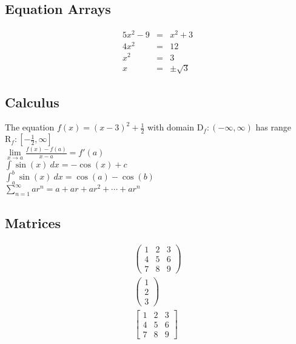 \documentclass[11pt]{article}
\begin{document}
\subsection{Equation Arrays}
\begin{eqnarray*}
5x^2-9&=&x^2+3\\
4x^2&=&12\\
x^2&=&3\\
x&=&\pm\sqrt{3}
\end{eqnarray*}

\subsection{Calculus}
The equation $f(x)=(x-3)^2+\frac{1}{2}$ with domain $\mathrm{D}_f:(-\infty,\infty)$ has range $\mathrm{R}_f:\left[-\frac{1}{2}, \infty\right]$\\

$\displaystyle{\lim \limits_{x \to a} \frac{f(x)-f(a)}{x-a} =f'(a)}$\\

$\displaystyle{\int \sin (x)\ dx = -\cos (x)+c}$\\

$\displaystyle{\int_a^b \sin (x)\ dx = \cos (a) - \cos (b)}$\\

$\displaystyle{\sum \limits_{n=1}^{\infty}ar^n=a+ar+ar^2+ \cdots +ar^n}$

\subsection{Matrices}
\begin{eqnarray*}
\begin{pmatrix}
1 & 2 & 3 \\
4 & 5 & 6 \\
7 & 8 & 9
\end{pmatrix}\\
\begin{pmatrix}
1 \\
2 \\
3 
\end{pmatrix} \\
\begin{bmatrix}
1 & 2 & 3 \\
4 & 5 & 6 \\
7 & 8 & 9
\end{bmatrix}
\end{eqnarray*}
\end{document}
